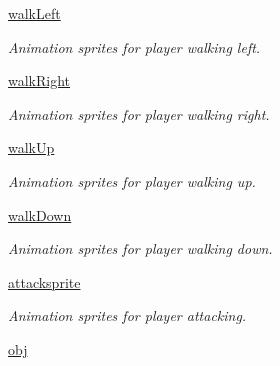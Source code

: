 \begin{DoxyCompactItemize}
\hyperlink{classactor_1_1player_1_1_player_a6a324fb53de6ee4b4bab31ea3fc0ffcf}{walk\+Left}
\begin{DoxyCompactList}\small\item\em Animation sprites for player walking left. \end{DoxyCompactList}\item 
\mbox{\label{classactor_1_1player_1_1_player_ae4f80d82c8fa045ba5f244d3418b1a1a}} 
\hyperlink{classactor_1_1player_1_1_player_ae4f80d82c8fa045ba5f244d3418b1a1a}{walk\+Right}
\begin{DoxyCompactList}\small\item\em Animation sprites for player walking right. \end{DoxyCompactList}\item 
\mbox{\label{classactor_1_1player_1_1_player_ae184fcb45669b5da9ce115fcf4446099}} 
\hyperlink{classactor_1_1player_1_1_player_ae184fcb45669b5da9ce115fcf4446099}{walk\+Up}
\begin{DoxyCompactList}\small\item\em Animation sprites for player walking up. \end{DoxyCompactList}\item 
\mbox{\label{classactor_1_1player_1_1_player_a4671e233ca20a575cd6cf6019a56bb12}} 
\hyperlink{classactor_1_1player_1_1_player_a4671e233ca20a575cd6cf6019a56bb12}{walk\+Down}
\begin{DoxyCompactList}\small\item\em Animation sprites for player walking down. \end{DoxyCompactList}\item 
\mbox{\label{classactor_1_1player_1_1_player_a544178e6ebb1b49a348753c870df24f1}} 
\hyperlink{classactor_1_1player_1_1_player_a544178e6ebb1b49a348753c870df24f1}{attacksprite}
\begin{DoxyCompactList}\small\item\em Animation sprites for player attacking. \end{DoxyCompactList}\item 
\mbox{\label{classactor_1_1player_1_1_player_a4f3f92ac7e33ec63e49914610d1cd5ed}} 
\hyperlink{classactor_1_1player_1_1_player_a4f3f92ac7e33ec63e49914610d1cd5ed}{obj}

\end{DoxyCompactItemize}
